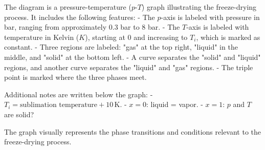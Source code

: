 The diagram is a pressure-temperature (\( p \)-\( T \)) graph illustrating the freeze-drying process. It includes the following features:  
- The \( p \)-axis is labeled with pressure in bar, ranging from approximately 0.3 bar to 8 bar.  
- The \( T \)-axis is labeled with temperature in Kelvin (\( K \)), starting at 0 and increasing to \( T_i \), which is marked as constant.  
- Three regions are labeled: "gas" at the top right, "liquid" in the middle, and "solid" at the bottom left.  
- A curve separates the "solid" and "liquid" regions, and another curve separates the "liquid" and "gas" regions.  
- The triple point is marked where the three phases meet.  

Additional notes are written below the graph:  
- \( T_i = \text{sublimation temperature} + 10 \, \text{K} \).  
- \( x = 0 \): liquid = vapor.  
- \( x = 1 \): \( p \) and \( T \) are solid?  

The graph visually represents the phase transitions and conditions relevant to the freeze-drying process.